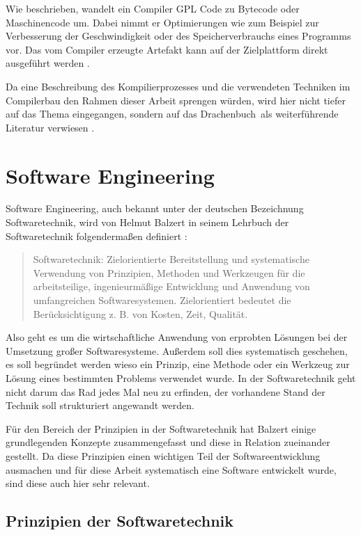 \documentclass[12pt,oneside,a4paper,parskip]{scrbook}
\begin{document}
Wie beschrieben, wandelt ein Compiler GPL Code zu Bytecode oder Maschinencode um. Dabei nimmt er Optimierungen wie zum Beispiel zur Verbesserung der Geschwindigkeit oder des Speicherverbrauchs eines Programms vor. Das vom Compiler erzeugte Artefakt kann auf der Zielplattform direkt ausgeführt werden \cite[S. 345ff.]{czaeis2000}.
	
Da eine Beschreibung des Kompilierprozesses und die verwendeten Techniken im Compilerbau den Rahmen dieser Arbeit sprengen würden, wird hier nicht tiefer auf das Thema eingegangen, sondern auf das \glqq Drachenbuch\grqq\ als weiterführende Literatur verwiesen \cite{aho2006}.

\section{Software Engineering}

Software Engineering, auch bekannt unter der deutschen Bezeichnung Softwaretechnik, wird von Helmut Balzert in seinem Lehrbuch der Softwaretechnik folgendermaßen definiert \cite[S.17]{balzert2009a}:

\begin{quote}
	Softwaretechnik: Zielorientierte Bereitstellung und systematische Verwendung von Prinzipien, Methoden und Werkzeugen für	die arbeitsteilige, ingenieurmäßige Entwicklung und Anwendung von umfangreichen Softwaresystemen. Zielorientiert bedeutet die	Berücksichtigung z. B. von Kosten, Zeit, Qualität.
\end{quote}

Also geht es um die wirtschaftliche Anwendung von erprobten Lösungen bei der Umsetzung großer Softwaresysteme. Außerdem soll dies systematisch geschehen, es soll begründet werden wieso ein Prinzip, eine Methode oder ein Werkzeug zur Lösung eines bestimmten Problems verwendet wurde. In der Softwaretechnik geht nicht darum das Rad jedes Mal neu zu erfinden, der vorhandene Stand der Technik soll strukturiert angewandt werden.

Für den Bereich der Prinzipien in der Softwaretechnik hat Balzert einige grundlegenden Konzepte zusammengefasst und diese in Relation zueinander gestellt. Da diese Prinzipien einen wichtigen Teil der Softwareentwicklung ausmachen und für diese Arbeit systematisch eine Software entwickelt wurde, sind diese auch hier sehr relevant.

\subsection{Prinzipien der Softwaretechnik}
\end{document}
